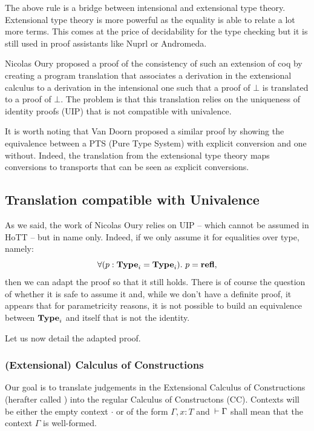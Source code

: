 \documentclass[11pt]{article}
\theoremstyle{plain}
\theoremstyle{remark}
\begin{document}
\begin{mathc}
\end{mathc}
%
The above rule is a bridge between intensional and extensional type theory.
Extensional type theory is more powerful as the equality is able to relate a lot
more terms. This comes at the price of decidability for the type checking but it
is still used in proof assistants like Nuprl or Andromeda.

Nicolas Oury proposed a proof of the consistency of such an extension of coq by
creating a program translation that associates a derivation in the extensional
calculus to a derivation in the intensional one such that a proof of $\bot$
is translated to a proof of $\bot$.
The problem is that this translation relies on the uniqueness of identity
proofs (UIP) that is not compatible with univalence.

It is worth noting that Van Doorn \etal proposed a similar proof by showing the
equivalence between a PTS (Pure Type System) with explicit conversion and one
without. Indeed, the translation from the extensional type theory maps
conversions to transports that can be seen as explicit conversions.

\subsection{Translation compatible with Univalence}

As we said, the work of Nicolas Oury relies on UIP -- which cannot be assumed in
HoTT -- but in name only. Indeed, if we only assume it for equalities over
type, namely:
\[ \forall (p : \operatorname{\mathbf{Type}}_i = \operatorname{\mathbf{Type}}_i).\ p = \operatorname{\mathbf{refl}}, \]
then we can adapt the proof so that it still holds.
There is of course the question of whether it is safe to assume it and, while
we don't have a definite proof, it appears that for parametricity reasons,
it is not possible to build an equivalence between $\operatorname{\mathbf{Type}}_i$ and itself that
is not the identity.

Let us now detail the adapted proof.

\subsubsection{(Extensional) Calculus of Constructions}

Our goal is to translate judgements in the Extensional Calculus of
Constructions (herafter called \CCe) into the regular Calculus of Constructons
(CC). Contexts will be either the empty context $\cdot$ or of the form
$\Gamma, x:T$ and $\,\vdash \Gamma$ shall mean that the context $\Gamma$ is
well-formed.
\end{document}
